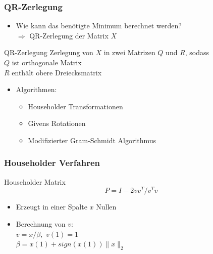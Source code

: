 \documentclass{beamer}
\begin{document}
\begin{frame}
  \frametitle{QR-Zerlegung}
  
  \begin{itemize}
  \item Wie kann das benötigte Minimum berechnet werden?\\
    $\Rightarrow$ QR-Zerlegung der Matrix $X$
  \end{itemize}

  \begin{block}{QR-Zerlegung}
    Zerlegung von $X$ in zwei Matrizen $Q$ und $R$, sodass \\
    \qquad $Q$ ist orthogonale Matrix \\
    \qquad $R$ enthält obere Dreiecksmatrix \\
  \end{block}

  \pause

  \begin{itemize}
  \item Algorithmen:
    \begin{itemize}
    \item Householder Transformationen 
    \item Givens Rotationen 
    \item Modifizierter Gram-Schmidt Algorithmus 
    \end{itemize}
  \end{itemize}

\end{frame}

\begin{frame}
  \frametitle{Householder Verfahren}
  \begin{block}{Householder Matrix}
    \[ P = I - 2vv^T / v^Tv \]    
    \begin{itemize}
    \item Erzeugt in einer Spalte $x$ Nullen
    \end{itemize}
  \end{block}
  
  \begin{itemize}
  \item Berechnung von $v$:\\
    $v = x / \beta,$\hspace{1cm} $v(1) = 1$ \\
    $\beta = x(1) + sign(x(1)) \|x\|_2$
  \end{itemize}

\end{frame}
\end{document}
